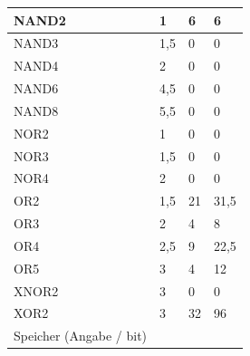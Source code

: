 \documentclass[11pt]{report}
\begin{document}
\begin{table}[]
\begin{tabular}{llll}
			\multicolumn{1}{|l|}{NAND2}                  & \multicolumn{1}{l|}{1}     & \multicolumn{1}{l|}{6}  & \multicolumn{1}{l|}{6}     \\ \hline
			\multicolumn{1}{|l|}{NAND3}                  & \multicolumn{1}{l|}{1,5}   & \multicolumn{1}{l|}{0}  & \multicolumn{1}{l|}{0}     \\ \hline
			\multicolumn{1}{|l|}{NAND4}                  & \multicolumn{1}{l|}{2}     & \multicolumn{1}{l|}{0}  & \multicolumn{1}{l|}{0}     \\ \hline
			\multicolumn{1}{|l|}{NAND6}                  & \multicolumn{1}{l|}{4,5}   & \multicolumn{1}{l|}{0}  & \multicolumn{1}{l|}{0}     \\ \hline
			\multicolumn{1}{|l|}{NAND8}                  & \multicolumn{1}{l|}{5,5}   & \multicolumn{1}{l|}{0}  & \multicolumn{1}{l|}{0}     \\ \hline
			\multicolumn{1}{|l|}{NOR2}                   & \multicolumn{1}{l|}{1}     & \multicolumn{1}{l|}{0}  & \multicolumn{1}{l|}{0}     \\ \hline
			\multicolumn{1}{|l|}{NOR3}                   & \multicolumn{1}{l|}{1,5}   & \multicolumn{1}{l|}{0}  & \multicolumn{1}{l|}{0}     \\ \hline
			\multicolumn{1}{|l|}{NOR4}                   & \multicolumn{1}{l|}{2}     & \multicolumn{1}{l|}{0}  & \multicolumn{1}{l|}{0}     \\ \hline
			\multicolumn{1}{|l|}{OR2}                    & \multicolumn{1}{l|}{1,5}   & \multicolumn{1}{l|}{21} & \multicolumn{1}{l|}{31,5}  \\ \hline
			\multicolumn{1}{|l|}{OR3}                    & \multicolumn{1}{l|}{2}     & \multicolumn{1}{l|}{4}  & \multicolumn{1}{l|}{8}     \\ \hline
			\multicolumn{1}{|l|}{OR4}                    & \multicolumn{1}{l|}{2,5}   & \multicolumn{1}{l|}{9}  & \multicolumn{1}{l|}{22,5}  \\ \hline
			\multicolumn{1}{|l|}{OR5}                    & \multicolumn{1}{l|}{3}     & \multicolumn{1}{l|}{4}  & \multicolumn{1}{l|}{12}    \\ \hline
			\multicolumn{1}{|l|}{XNOR2}                  & \multicolumn{1}{l|}{3}     & \multicolumn{1}{l|}{0}  & \multicolumn{1}{l|}{0}     \\ \hline
			\multicolumn{1}{|l|}{XOR2}                   & \multicolumn{1}{l|}{3}     & \multicolumn{1}{l|}{32} & \multicolumn{1}{l|}{96}    \\ \hline
			\multicolumn{1}{|l}{Speicher (Angabe / bit)} &                            &                         & \multicolumn{1}{l|}{}      \\ \hline

\end{tabular}
\end{table}
\end{document}
